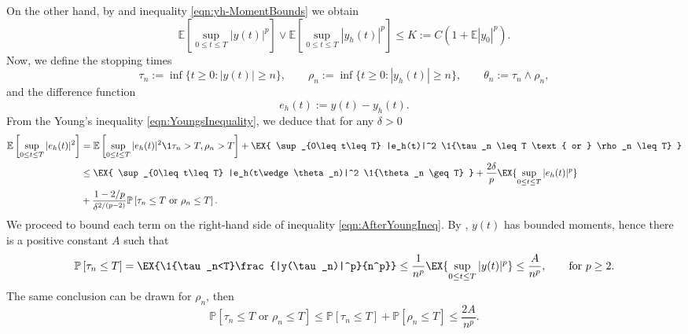 \documentclass[3p]{elsarticle}
\theoremstyle{definition}
\theoremstyle{plain}%
\theoremstyle{remark}
\newcommand{\m}[1]{\mathbb{E}#1}
\newcommand{\Prob}[1]{\mathbb{P}\left[#1\right]}
\begin{document}
\begin{pf}
		On the other hand, by  and inequality \eqref{eqn:yh-MomentBounds} we obtain
	\begin{equation*}
		\m\left[
			\sup_{0\leq t \leq T}
				|y(t)|^p
		\right]
		\vee
		\m\left[
			\sup_{0\leq t \leq T}
				|y_h(t)|^p
		\right]
		\leq
		K := C
		\left( 
			1+\m |y_0|^p
		\right).
	\end{equation*}
	Now, we define the stopping times
	\begin{equation}\label{eqn:StoppingTimes}
		\tau_n := 
			\inf\{
				t\geq 0: |y(t)|\geq n
			\},
		\qquad
		\rho_n := 
			\inf\{
				t\geq 0: |y_h(t)|\geq n
			\},
		\qquad
		\theta_n:=
			\tau_n \wedge \rho_n,
	\end{equation}
	and the difference function
	\begin{equation*}
		e_h(t):= y(t) - y_h(t).
	\end{equation*}
	From the Young's inequality \eqref{eqn:YoungsInequality}, we deduce that for any $\delta>0$ 
	\begin{align}
		\m\left[
			\sup_{0\leq t\leq T}
			|e_h(t)|^2
		\right]
		&=
			\m\left[
				\sup_{0\leq t\leq T}
				|e_h(t)|^2
				\1{\tau_n>T,\rho_n>T}
			\right]
			+
			\EX{
				\sup_{0\leq t\leq T}
				|e_h(t)|^2
				\1{\tau_n \leq T \text{ or } \rho_n \leq T}
			}\notag\\
		&\leq
			\EX{
				\sup_{0\leq t\leq T}
				|e_h(t\wedge \theta_n)|^2
				\1{\theta_n \geq T}
			}
			+\frac{2\delta}{p}
			\EX{
				\sup_{0\leq t\leq T}
				|e_h(t)|^p 
			}\notag \\
		&+
			\frac{1-2/p}{\delta^{2/(p-2)}}
			\Prob{\tau_n \leq T \text{ or } \rho_n \leq T}.
	\label{eqn:AfterYoungIneq}
	\end{align}
	We proceed to bound each term on the right-hand side of inequality \eqref{eqn:AfterYoungIneq}.
	By , $y(t)$ has bounded moments, hence 
	there is a positive constant $A$ such that
	\begin{equation}\label{eqn:BoundProbTauR}
		\Prob{\tau_n\leq T}
		=
			\EX{\1{\tau_n<T}\frac{|y(\tau_n)|^p}{n^p}}
		\leq
			\frac{1}{n^p}\EX{\sup_{0\leq t\leq T}|y(t)|^p} \leq \frac{A}{n^p},
			\qquad \text{for } p\geq 2.
	\end{equation}
	The same conclusion can be drawn for $\rho_n$, then
	\begin{equation} \label{eqn:BoundProbTauRorRhoR}
		\Prob{\tau_n \leq T \text{ or } \rho_n \leq T}
		\leq
			\Prob{\tau_n\leq T}+\Prob{\rho_n\leq T}
		\leq
		\frac{2A}{n^p}.
	\end{equation}

\end{pf}
\end{document}
